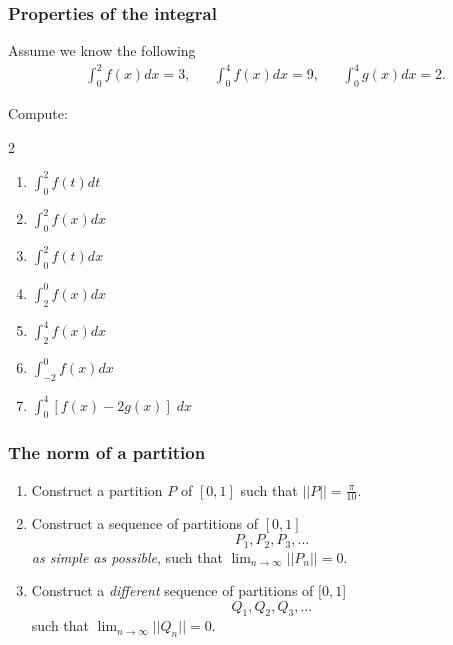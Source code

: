 \begin{frame}
	\fontsize{13}{13}\selectfont
	\frametitle{Properties of the integral}

	Assume we know the following
	\begin{align*}
		 & \int_{0}^{2}f(x) dx = 3, &  & \int_{0}^{4}f(x) dx = 9, &  & \int_{0}^{4}g(x) dx = 2.
	\end{align*}

	Compute:
	\begin{multicols}{2}
		\begin{enumerate}
			\item $\displaystyle \int_{0}^{2}f(t) dt$

			\item $\displaystyle \int_{0}^{2}f(x) dx$

			\item $\displaystyle \int_{0}^{2}f(t) dx$

			\item $\displaystyle \int_{2}^{0}f(x) dx$

			\item $\displaystyle \int_{2}^{4}f(x) dx$

			\item $\displaystyle \int_{-2}^{0}f(x) dx$

			\item $\displaystyle \int_{0}^{4}\left[ f(x) - 2g(x) \right] \; dx$
		\end{enumerate}
	\end{multicols}
	\vfill
\end{frame}

\begin{frame}[t]
	\fontsize{13}{13}\selectfont
	\frametitle{The norm of a partition}

	\begin{enumerate}
		\item Construct a partition $P$ of $[0,1]$ such that $\displaystyle ||P|| = \frac{\pi}{10}$.

		\item Construct a sequence of partitions of $[0,1]$
			\[
				P_{1}, P_{2}, P_{3}, \ldots
			\]
			\emph{as simple as possible}, such that $\displaystyle \lim_{n \to \infty}|
			|P_{n}|| = 0$.

		\item Construct a \emph{different} sequence of partitions of $[0,1$]
			\[
				Q_{1}, Q_{2}, Q_{3}, \ldots
			\]
			such that $\displaystyle \lim_{n \to \infty}||Q_{n}|| = 0$.
	\end{enumerate}
\end{frame}

